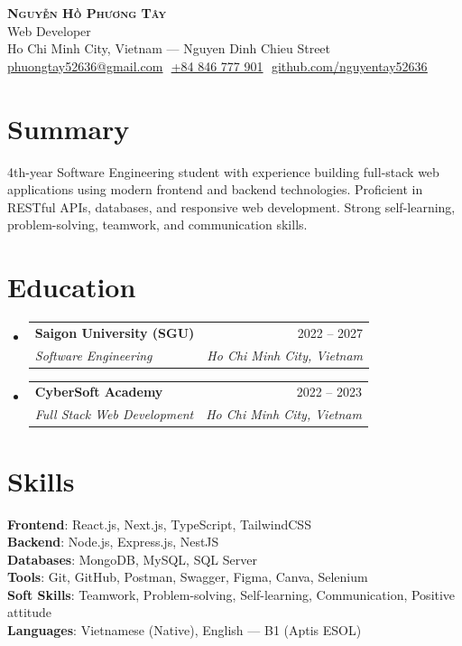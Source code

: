\documentclass[letterpaper,11pt]{article}
\makeatletter
\newcommand{\resumeSubheading}[4]{
  \vspace{-2pt}\item
    \begin{tabular*}{0.97\textwidth}[t]{l@{\extracolsep{\fill}}r}
      \textbf{#1} & #2 \\
      \textit{\small#3} & \textit{\small #4} \\
    \end{tabular*}\vspace{-7pt}
}
\newcommand{\resumeSubHeadingListStart}{\begin{itemize}[leftmargin=0.15in, label={}]}
\newcommand{\resumeSubHeadingListEnd}{\end{itemize}}
\makeatother
\begin{document}
\begin{center}
    \textbf{\Huge \scshape Nguyễn Hồ Phương Tây} \\ \vspace{4pt}
    \large Web Developer \\ \vspace{8pt}
    \small
    Ho Chi Minh City, Vietnam --- Nguyen Dinh Chieu Street \\
    \href{mailto:phuongtay52636@gmail.com}{\underline{phuongtay52636@gmail.com}} $  $
    \underline{+84 846 777 901} $  $
    \href{https://github.com/nguyentay52636}{\underline{github.com/nguyentay52636}}
\end{center}

\section{Summary}
\small{
4th-year Software Engineering student with experience building full-stack web applications using modern frontend and backend technologies. Proficient in RESTful APIs, databases, and responsive web development. Strong self-learning, problem-solving, teamwork, and communication skills.
}

\section{Education}
  \resumeSubHeadingListStart

    \resumeSubheading
      {Saigon University (SGU)}{2022 -- 2027}
      {Software Engineering}{Ho Chi Minh City, Vietnam}

    \resumeSubheading
      {CyberSoft Academy}{2022 -- 2023}
      {Full Stack Web Development}{Ho Chi Minh City, Vietnam}

  \resumeSubHeadingListEnd

\section{Skills}
 \begin{itemize}[leftmargin=0.15in, label={}]
    \small{\item{
     \textbf{Frontend}{: React.js, Next.js, TypeScript, TailwindCSS} \\
     \textbf{Backend}{: Node.js, Express.js, NestJS} \\
     \textbf{Databases}{: MongoDB, MySQL, SQL Server} \\
     \textbf{Tools}{: Git, GitHub, Postman, Swagger, Figma, Canva, Selenium} \\
     \textbf{Soft Skills}{: Teamwork, Problem-solving, Self-learning, Communication, Positive attitude} \\
     \textbf{Languages}{: Vietnamese (Native), English — B1 (Aptis ESOL)}
    }}
 \end{itemize}
\end{document}
